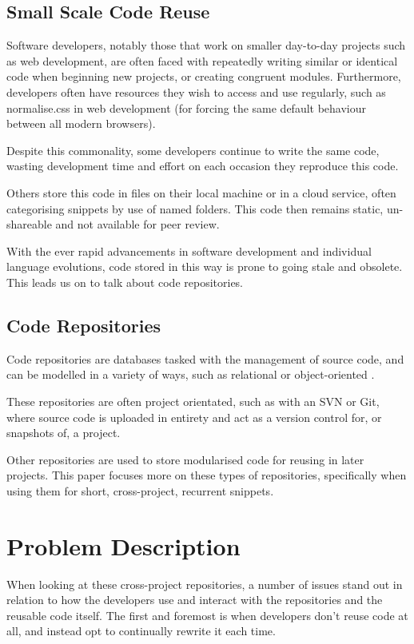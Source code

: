\subsection{Small Scale Code Reuse}
Software developers, notably those that work on smaller day-to-day projects such as web development, are often faced with repeatedly writing similar or identical code when beginning new projects, or creating congruent modules. 
Furthermore, developers often have resources they wish to access and use regularly, such as normalise.css in web development (for forcing the same default behaviour between all modern browsers).

Despite this commonality, some developers continue to write the same code, wasting development time and effort on each occasion they reproduce this code. 

Others store this code in files on their local machine or in a cloud service, often categorising snippets by use of named folders. 
This code then remains static, un-shareable and not available for peer review. 

With the ever rapid advancements in software development and individual language evolutions, code stored in this way is prone to going stale and obsolete. 
This leads us on to talk about code repositories.

\subsection{Code Repositories}
Code repositories are databases tasked with the management of source code, and can be modelled in a variety of ways, such as relational or object-oriented \cite{Cox1999}.

These repositories are often project orientated, such as with an SVN or Git, where source code is uploaded in entirety and act as a version control for, or snapshots of, a project.

Other repositories are used to store modularised code for reusing in later projects. 
This paper focuses more on these types of repositories, specifically when using them for short, cross-project, recurrent snippets.

\section{Problem Description} \label{probdesc}
When looking at these cross-project repositories, a number of issues stand out in relation to how the developers use and interact with the repositories and the reusable code itself. 
The first and foremost is when developers don’t reuse code at all, and instead opt to continually rewrite it each time.

